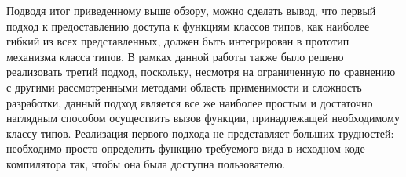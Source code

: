Подводя итог приведенному выше обзору, можно сделать вывод, что первый подход к предоставлению доступа к функциям классов типов, как наиболее гибкий из всех представленных, должен быть интегрирован в прототип механизма класса типов. В рамках данной работы также было решено реализовать третий подход, поскольку, несмотря на ограниченную по сравнению с другими рассмотренными методами область применимости и сложность разработки, данный подход является все же наиболее простым и достаточно наглядным способом осуществить вызов функции, принадлежащей необходимому классу типов. 
Реализация первого подхода не представляет больших трудностей: необходимо просто определить функцию требуемого вида в исходном коде компилятора так, чтобы она была доступна пользователю. 

